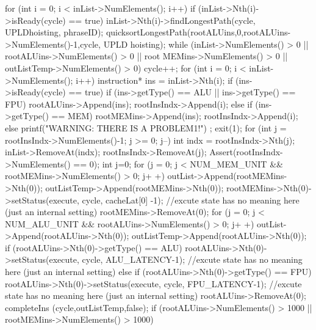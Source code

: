 \begin{DoxyCode}
                                                                                 
                                                             {
        for (int i = 0; i < inList->NumElements(); i++) {
                if (inList->Nth(i)->isReady(cycle) == true) {
                        inList->Nth(i)->findLongestPath(cycle, UPLDhoisting, 
      phraseID);
                }
        }
        quicksortLongestPath(rootALUins,0,rootALUins->NumElements()-1,cycle, UPLD
      hoisting);
        while (inList->NumElements() > 0 || rootALUins->NumElements() > 0 || root
      MEMins->NumElements() > 0 || outListTemp->NumElements() > 0) {
                cycle++;
                for (int i = 0; i < inList->NumElements(); i++) {
                        instruction* ins = inList->Nth(i);
                        if (ins->isReady(cycle) == true) {
                                if (ins->getType() == ALU || ins->getType() == 
      FPU) {
                                        rootALUins->Append(ins);
                                        rootInsIndx->Append(i);
                                } else if (ins->getType() == MEM) {
                                        rootMEMins->Append(ins);
                                        rootInsIndx->Append(i);
                                } else {
                                        printf("WARNING: THERE IS A PROBLEM1!\n")
      ;
                                        exit(1);
                                }
                        }
                }
                for (int j = rootInsIndx->NumElements()-1; j >= 0; j--) {
                        int indx = rootInsIndx->Nth(j);
                        inList->RemoveAt(indx);
                        rootInsIndx->RemoveAt(j);
                }
                Assert(rootInsIndx->NumElements() == 0);
                int j=0;
                for (j = 0; j < NUM_MEM_UNIT && rootMEMins->NumElements() > 0; j+
      +) {
                        outList->Append(rootMEMins->Nth(0));
                        outListTemp->Append(rootMEMins->Nth(0));
                        rootMEMins->Nth(0)->setStatus(execute, cycle, cacheLat[0]
      -1); //excute state has no meaning here (just an internal setting)
                        rootMEMins->RemoveAt(0);
                }
                for (j = 0; j < NUM_ALU_UNIT && rootALUins->NumElements() > 0; j+
      +) {
                        outList->Append(rootALUins->Nth(0));
                        outListTemp->Append(rootALUins->Nth(0));
                        if (rootALUins->Nth(0)->getType() == ALU) {
                                rootALUins->Nth(0)->setStatus(execute, cycle, 
      ALU_LATENCY-1); //excute state has no meaning here (just an internal setting)
                        } else if (rootALUins->Nth(0)->getType() == FPU) {
                                rootALUins->Nth(0)->setStatus(execute, cycle, 
      FPU_LATENCY-1); //excute state has no meaning here (just an internal setting)
                        }
                        rootALUins->RemoveAt(0);
                }
                completeIns (cycle,outListTemp,false);
        }
        if (rootALUins->NumElements() > 1000 || rootMEMins->NumElements() > 1000)
      
}
\end{DoxyCode}
